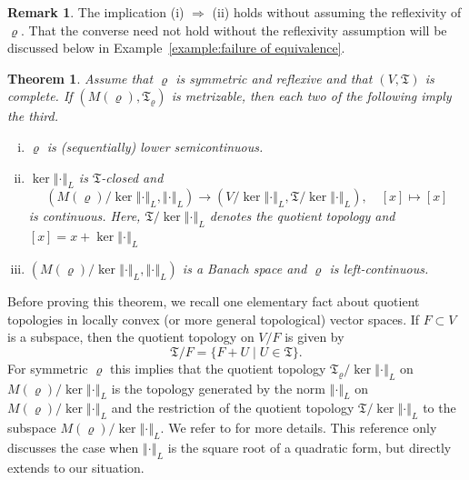 \documentclass[a4paper,11pt,reqno]{amsart}
\newtheorem{theorem}[lemma]{Theorem}
\theoremstyle{definition}
\newtheorem{remark}[lemma]{Remark}
\numberwithin{equation}{section}
\newcommand{\vr}{{\varrho}}
\newcommand{\av}[1]{\left\Vert #1\right\Vert}
\newcommand{\1}{\mathds{1}}
\begin{document}
 \begin{remark}
  The implication (i) $\Rightarrow$ (ii) holds without assuming the reflexivity of $\vr$. That the converse need not hold without the reflexivity assumption will be discussed below in Example~\ref{example:failure of equivalence}. 
 \end{remark}

 
 
% 



\begin{theorem}\label{theorem:two imply the third}
Assume that $\vr$ is symmetric and reflexive and that $(V,\mathfrak{T})$ is complete. If $(M(\vr),\mathfrak{T}_\vr)$ is metrizable, then each two of the following imply the third. 
\begin{enumerate}[(i)]
 \item $\vr$ is (sequentially) lower semicontinuous.
 \item $\ker \av{\cdot}_L$ is $\mathfrak{T}$-closed and 
 $$(M(\vr)/\ker \av{\cdot}_L, \av{\cdot}_L) \to (V/\ker \av{\cdot}_L, \mathfrak{T}/\ker \av{\cdot}_L), \quad [x] \mapsto [x]$$
 is continuous. Here,  $\mathfrak{T}/\ker \av{\cdot}_L$ denotes the quotient topology and $[x] = x + \ker \av{\cdot}_L$
\item $(M(\vr)/\ker \av{\cdot}_L, \av{\cdot}_L)$ is a Banach space and $\vr$ is left-continuous. 
\end{enumerate}
\end{theorem}

Before proving this theorem, we recall one elementary fact about quotient topologies in locally convex (or more general topological) vector spaces. If $F \subset V$ is a subspace, then the quotient topology on $V/F$ is given by 
%
$$\mathfrak{T} /F  = \{F + U \mid U \in \mathfrak{T}\}.$$
%
For symmetric $\vr$ this implies that the quotient topology $\mathfrak{T}_\vr / \ker \av{\cdot}_L$ on $M(\vr)/\ker \av{\cdot}_L$ is the topology generated by the norm $\av{\cdot}_L$ on $M(\vr)/\ker \av{\cdot}_L$  and the restriction of the quotient topology $\mathfrak{T}/\ker \av{\cdot}_L$ to the subspace  $M(\vr)/\ker \av{\cdot}_L$. We refer to \cite[Lemma 1.39]{Schmi3}  for more details. This reference only discusses the case when $\av{\cdot}_L$ is the square root of a quadratic form, but directly extends to our situation. 

 
\end{document}
